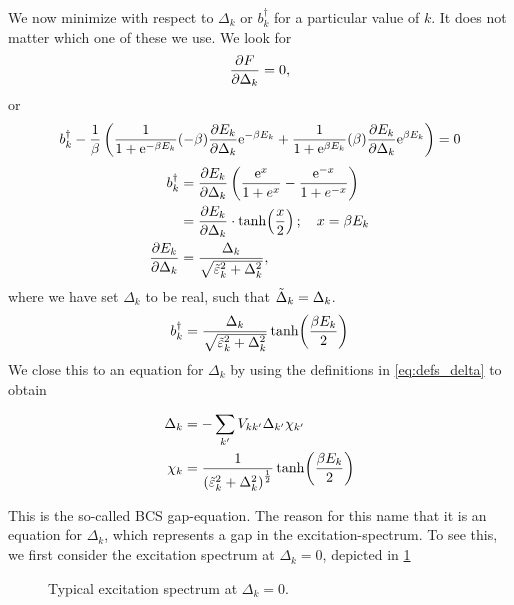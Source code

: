 We now minimize with respect to $\Delta_k$ or $b_k^\dagger$ for a particular value of $k$. It does not matter which one of these we use. We look for 
\begin{equation}
\pdv{F}{\Delta_k} = 0,
\end{equation}
or
\begin{equation*}
b_k^\dagger - \frac1\beta\left(\frac{1}{1+\mathrm{e}^{-\beta E_k}}(-\beta)\pdv{E_k}{\Delta_k}\mathrm{e}^{-\beta E_k} + \frac{1}{1+\mathrm{e}^{\beta E_k}}(\beta)\pdv{E_k}{\Delta_k}\mathrm{e}^{\beta E_k}\right) = 0
\end{equation*}
\begin{align*}
b_k^\dagger &= \pdv{E_k}{\Delta_k}\left(\frac{\mathrm{e}^x}{1+e^x} -\frac{\mathrm{e}^{-x}}{1+e^{-x}}\right) \\
&= \pdv{E_k}{\Delta_k}\cdot\tanh(\frac{x}{2})\, ;\quad x= \beta E_k \\
\pdv{E_k}{\Delta_k} &= \frac{\Delta_k}{\sqrt{\tilde{\varepsilon}_k^2 + \Delta_k^2}},
\end{align*}
where we have set $\Delta_k$ to be real, such that $\tilde{\Delta}_k = \Delta_k$.
\begin{equation}
b_k^\dagger = \frac{\Delta_k}{\sqrt{\tilde{\varepsilon}_k^2 + \Delta_k^2}}\tanh(\frac{\beta E_k}{2})
\end{equation}
We close this to an equation for $\Delta_k$ by using the definitions in \cref{eq:defs_delta} to obtain
\begin{tcolorbox}
	\begin{align}
	\label{eq:BCS_gap}
	\Delta_k &= -\sum_{k'}V_{kk'}\Delta_{k'}\chi_{k'} \\
	\chi_k &= \frac{1}{\left(\tilde{\varepsilon}_k^2+\Delta_k^2\right)^\frac12}\tanh(\frac{\beta E_k}{2})
	\end{align}
\end{tcolorbox}
This is the so-called BCS gap-equation. The reason for this name that it is an equation for $\Delta_k$, which represents a gap in the excitation-spectrum. To see this, we first consider the excitation spectrum at $\Delta_k = 0$, depicted in \cref{fig:excitation_spectrum_no_delta}
\begin{figure}
	\centering
	\begin{subfigure}{0.49\linewidth}
		\centering
		
	\end{subfigure}
	\begin{subfigure}{0.49\linewidth}
		\centering
		
	\end{subfigure}

	\caption{Typical excitation spectrum at $\Delta_k = 0$. }
	\label{fig:excitation_spectrum_no_delta}
\end{figure}
